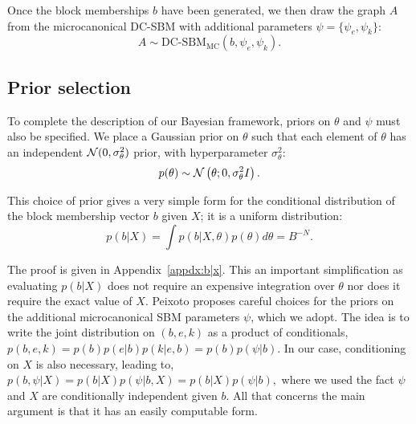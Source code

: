 Once the block memberships $b$ have been generated, we then draw the 
graph $A$ from the microcanonical DC-SBM with additional parameters 
$\psi = \{\psi_e, \psi_k\}$:
%
\begin{equation}
	A \sim \textrm{DC-SBM}_{\textrm{MC}} (b, \psi_e, \psi_k).
	\label{eqn:A-generation}
\end{equation}

\subsection{Prior selection}

To complete the description of our Bayesian framework,
priors on $\theta$ and $\psi$ must also be specified. 
We place a Gaussian prior on $\theta$ such that
each element of $\theta$ has an independent ${\cal N}(0,\sigma_\theta^2)$
prior, with hyperparameter $\sigma_\theta^2$:
%
\begin{equation}
	p(\theta) \sim \mathcal{N} \left( \theta ; 0, \sigma_\theta^2 I \right).
	\label{eqn:theta-prior}
\end{equation}

This choice of prior gives a very
simple form for the conditional distribution of the block membership vector $b$ given $X$; it is a uniform distribution:
%
\begin{equation}
	p(b | X) = \int p(b | X, \theta) p(\theta) d\theta = B^{-N}.
	\label{eqn:b-pseudo-prior}
\end{equation}

The proof is given in Appendix~\ref{appdx:b|x}. This an important simplification as evaluating $p(b | X)$ does not require an expensive  integration over $\theta$ nor does it require the exact value of $X$.
Peixoto \cite{Peixoto-Bayesian-Microcanonical} proposes careful choices for 
the priors on the additional microcanonical SBM parameters $\psi$, which we adopt. 
The idea is to write the joint distribution on $(b, e, k)$ as a product of 
conditionals, $p(b, e, k) = p(b) p(e | b) p(k | e, b)= p(b) p(\psi | b)$. 
In our case, conditioning on $X$ is also necessary, leading to,
$
	p(b, \psi | X) = p(b | X) p(\psi | b, X) = p(b | X) p(\psi | b),
$
where we used the fact $\psi$ and $X$ are conditionally 
independent given $b$.
All that concerns the main argument is that it has
an easily computable form.
